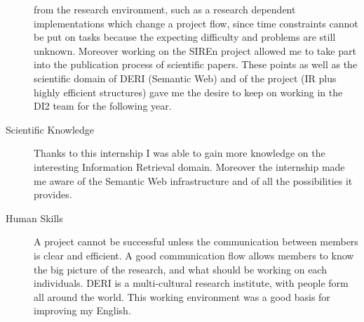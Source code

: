 \begin{description}
from the research environment, such as a research dependent implementations
which change a project flow, since time constraints cannot be put on tasks
because the expecting difficulty and problems are still unknown. Moreover
working on the SIREn project allowed me to take part into the publication
process of scientific papers. These points as well as the scientific domain of
DERI (Semantic Web) and of the project (IR plus highly efficient structures)
gave me the desire to keep on working in the DI2 team for the following year.
\item[Scientific Knowledge] Thanks to this internship I was able to gain more
knowledge on the interesting Information Retrieval domain. Moreover the
internship made me aware of the Semantic Web infrastructure and of all the
possibilities it provides.
\item[Human Skills] A project cannot be successful unless the communication
between members is clear and efficient. A good communication flow allows
members to know the big picture of the research, and what should be working on
each individuals. DERI is a multi-cultural research institute, with
people form all around the world. This working environment was a good basis for
improving my English.
\end{description}